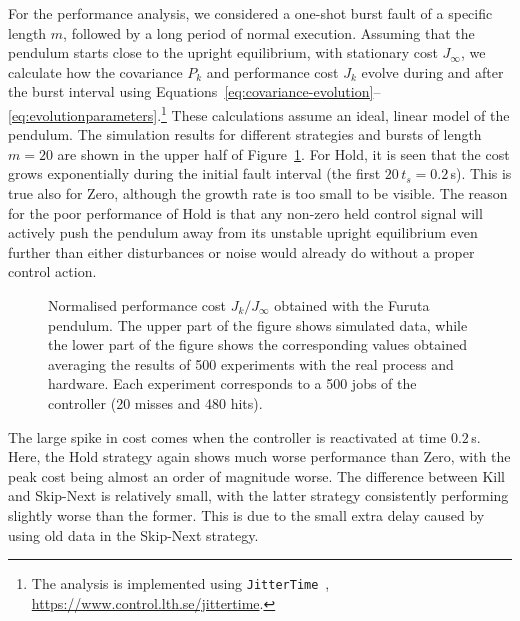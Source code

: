 For the performance analysis, we considered a one-shot burst fault of a specific length $m$, followed by a long period of normal execution. 
Assuming that the pendulum starts close to the upright equilibrium, with stationary cost $J_\infty$, we calculate how the covariance $P_k$ and performance cost $J_k$ evolve during and after the burst interval using Equations~\eqref{eq:covariance-evolution}--\eqref{eq:evolutionparameters}.\footnote{The analysis is implemented using \texttt{JitterTime}~\cite{Cervin:2019}, \url{https://www.control.lth.se/jittertime}.} 
These calculations assume an ideal, linear model of the pendulum. 
The simulation results for different strategies and bursts of length $m=20$ are shown in the upper half of Figure~\ref{fig:cost_simvsreal}. 
For Hold, it is seen that the cost grows exponentially during the initial fault interval (the first $20\,t_s=0.2\,$s). 
This is true also for Zero, although the growth rate is too small to be visible.
The reason for the poor performance of Hold is that any non-zero held control signal will actively push the pendulum away from its unstable upright equilibrium even further than either disturbances or noise would already do without a proper control action.
%
\begin{figure}
    \centering
    
    \caption{Normalised performance cost $J_k/J_\infty$ obtained with the Furuta pendulum.
        The upper part of the figure shows simulated data, while the lower part of the figure shows the corresponding values obtained averaging the results of 500 experiments with the real process and hardware.
        Each experiment corresponds to a 500 jobs of the controller (20 misses and 480 hits).}
    \label{fig:cost_simvsreal}
\end{figure}


The large spike in cost comes when the controller is reactivated at time $0.2\,$s. 
Here, the Hold strategy again shows much worse performance than Zero, with the peak cost being almost an order of magnitude worse. 
The difference between Kill and Skip-Next is relatively small, with the latter strategy consistently performing slightly worse than the former. 
This is due to the small extra delay caused by using old data in the Skip-Next strategy.

